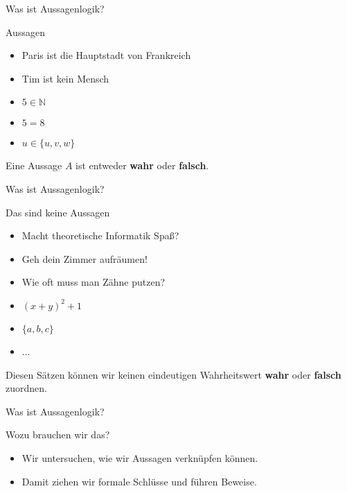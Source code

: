 %
%
%
%

\begin{frame}[fragile]{Was ist Aussagenlogik?}
	\begin{alertblock}{Aussagen}
		\begin{itemize}
			\item Paris ist die Hauptstadt von Frankreich
			\item Tim ist kein Mensch
			\item $5 \in \mathbb{N}$
			\item $5 = 8$
			\item $u \in \{u, v, w\}$
		\end{itemize}
	\end{alertblock}
	Eine Aussage $A$ ist entweder \textbf{wahr} oder \textbf{falsch}.
\end{frame}

\begin{frame}[fragile]{Was ist Aussagenlogik?}
	\begin{alertblock}{Das sind keine Aussagen}
		\begin{itemize}
			\item Macht theoretische Informatik Spaß?
			\item Geh dein Zimmer aufräumen!
			\item Wie oft muss man Zähne putzen?
			\item $(x+y)^2+1$
			\item $\{a,b,c\}$
			\item ...
		\end{itemize}
	\end{alertblock}
	Diesen Sätzen können wir keinen eindeutigen Wahrheitswert \textbf{wahr} oder \textbf{falsch} zuordnen.
\end{frame}

\begin{frame}[fragile]{Was ist Aussagenlogik?}
	\begin{alertblock}{Wozu brauchen wir das?}
		\begin{itemize}
			\item Wir untersuchen, wie wir Aussagen verknüpfen können.
			\item Damit ziehen wir formale Schlüsse und führen Beweise.
		\end{itemize}
	\end{alertblock}
\end{frame}


